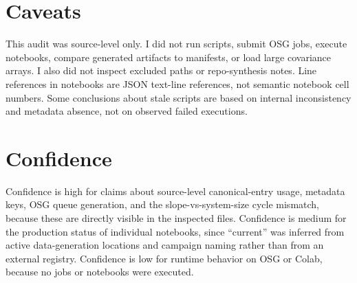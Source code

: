 \documentclass[aps,prb,onecolumn,nofootinbib,superscriptaddress]{revtex4-2}
\begin{document}
\section{Caveats}

This audit was source-level only.  I did not run scripts, submit OSG jobs, execute
notebooks, compare generated artifacts to manifests, or load large covariance
arrays.  I also did not inspect excluded paths or repo-synthesis notes.  Line
references in notebooks are JSON text-line references, not semantic notebook cell
numbers.  Some conclusions about stale scripts are based on internal inconsistency
and metadata absence, not on observed failed executions.

\section{Confidence}

Confidence is high for claims about source-level canonical-entry usage,
metadata keys, OSG queue generation, and the slope-vs-system-size cycle mismatch,
because these are directly visible in the inspected files.  Confidence is medium
for the production status of individual notebooks, since ``current'' was inferred
from active data-generation locations and campaign naming rather than from an
external registry.  Confidence is low for runtime behavior on OSG or Colab,
because no jobs or notebooks were executed.
\end{document}

